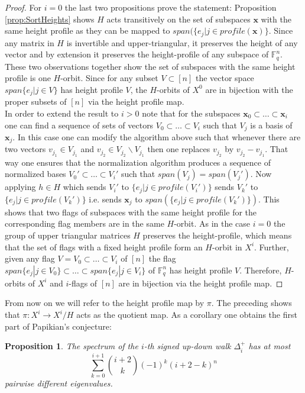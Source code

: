 \documentclass[11pt]{amsart}
\newtheorem{proposition}[theorem]{Proposition}
\begin{document}
    \begin{proof}
        For $i=0$ the last two propositions prove the statement: Proposition \ref{prop:SortHeights} shows $H$ acts transitively on the set of subspaces $\mathbf{x}$ with the same height profile as they can be mapped to $span(\{e_j|j\in profile(\mathbf{x})\}$. Since any matrix in $H$ is invertible and upper-triangular, it preserves the height of any vector and by extension it preserves the height-profile of any subspace of $\mathbb{F}_q^n$. These two observations together show the set of subspaces with the same height profile is one $H$-orbit. Since for any subset $V\subset [n]$ the vector space $span\{e_j|j\in V\}$ has height profile $V$, the $H$-orbits of $X^0$ are in bijection with the proper subsets of $[n]$ via the height profile map.\\
        In order to extend the result to $i>0$ note that for the subspaces $\mathbf{x}_0\subset\dots\subset \mathbf{x}_i$ one can find a sequence of sets of vectors $V_0\subset\dots\subset V_i$ such that $V_j$ is a basis of $\mathbf{x}_j$. In this case one can modify the algorithm above such that whenever there are two vectors $v_{j_1}\in V_{j_1}$ and $v_{j_2}\in V_{j_2}\backslash V_{j_1}$ then one replaces $v_{j_2}$ by $v_{j_2}-v_{j_1}$. That way one ensures that the normalization algorithm produces a sequence of normalized bases $V_0'\subset\dots\subset V_i'$ such that $span(V_j)=span(V_j')$. Now applying $h\in H$ which sends $V_i'$ to $\{e_j|j\in profile(V_i')\}$ sends $V_k'$ to $\{e_j|j\in profile(V_k')\}$ i.e. sends $\mathbf{x}_j$ to $span(\{e_j|j\in profile(V_k')\})$. This shows that two flags of subspaces with the same height profile for the corresponding flag members are in the same $H$-orbit. As in the case $i=0$ the group of upper triangular matrices $H$ preserves the height-profile, which means that the set of flags with a fixed height profile form an $H$-orbit in $X^i$. Further, given any flag $V=V_0\subset \dots \subset V_i$ of $[n]$ the flag $span\{e_j|j\in V_0\}\subset \dots\subset span\{e_j|j\in V_i\}$ of $\mathbb{F}_q^n$ has height profile $V$. Therefore, $H$-orbits of $X^i$ and $i$-flags of $[n]$ are in bijection via the height profile map.   
    \end{proof}
    From now on we will refer to the height profile map by $\pi$. The preceding shows that $\pi: X^i\rightarrow X^i/H$ acts as the quotient map. As a corollary one obtains the first part of Papikian's conjecture:
    \begin{proposition}
        The spectrum of the $i$-th signed up-down walk $\Delta_i^+$ has at most 
        \begin{equation}
            \sum_{k=0}^{i+1}\binom{i+2}{k} (-1)^k (i+2-k)^n
            \label{eq:QuotientSize}
        \end{equation}
        pairwise different eigenvalues.
        \label{thm:NumberEigenvalues}
    \end{proposition}
\end{document}
